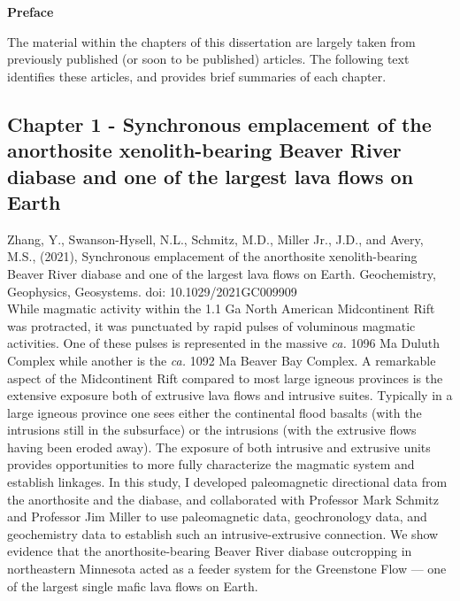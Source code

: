 \documentclass{ucbthesis}
\begin{document}
\begin{frontmatter}




\tableofcontents
\clearpage
\listoffigures
\clearpage
\listoftables

\clearpage


\begin{center}
\textbf{\large Preface}
\end{center}

The material within the chapters of this dissertation are largely taken from previously published (or soon to be published) articles. The following text identifies these articles, and provides brief summaries of each chapter.

\subsection{Chapter 1 - Synchronous emplacement of the anorthosite xenolith-bearing Beaver River diabase and one of the largest lava flows on Earth}

Zhang, Y., Swanson-Hysell, N.L., Schmitz, M.D., Miller Jr., J.D., and Avery, M.S., (2021), Synchronous emplacement of the anorthosite xenolith-bearing Beaver River diabase and one of the largest lava flows on Earth. Geochemistry, Geophysics, Geosystems. doi: 10.1029/2021GC009909
\\

While magmatic activity within the 1.1 Ga North American Midcontinent Rift was protracted, it was punctuated by rapid pulses of voluminous magmatic activities. One of these pulses is represented in the massive \textit{ca.} 1096 Ma Duluth Complex while another is the \textit{ca.} 1092 Ma Beaver Bay Complex. A remarkable aspect of the Midcontinent Rift compared to most large igneous provinces is the extensive exposure both of extrusive lava flows and intrusive suites. Typically in a large igneous province one sees either the continental flood basalts (with the intrusions still in the subsurface) or the intrusions (with the extrusive flows having been eroded away). The exposure of both intrusive and extrusive units provides opportunities to more fully characterize the magmatic system and establish linkages. In this study, I developed paleomagnetic directional data from the anorthosite and the diabase, and collaborated with Professor Mark Schmitz and Professor Jim Miller to use paleomagnetic data, geochronology data, and geochemistry data to establish such an intrusive-extrusive connection. We show evidence that the anorthosite-bearing Beaver River diabase outcropping in northeastern Minnesota acted as a feeder system for the Greenstone Flow --- one of the largest single mafic lava flows on Earth.


\end{frontmatter}
\end{document}

